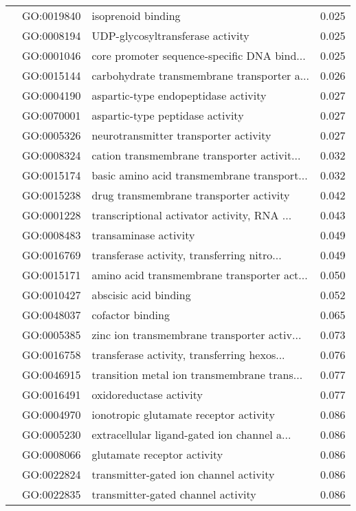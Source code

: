 \begin{longtable}{lllr}
   & GO:0019840 &                           isoprenoid binding &         0.025 \\
   & GO:0008194 &             UDP-glycosyltransferase activity &         0.025 \\
   & GO:0001046 &  core promoter sequence-specific DNA bind... &         0.025 \\
   & GO:0015144 &  carbohydrate transmembrane transporter a... &         0.026 \\
   & GO:0004190 &         aspartic-type endopeptidase activity &         0.027 \\
   & GO:0070001 &             aspartic-type peptidase activity &         0.027 \\
   & GO:0005326 &        neurotransmitter transporter activity &         0.027 \\
   & GO:0008324 &  cation transmembrane transporter activit... &         0.032 \\
   & GO:0015174 &  basic amino acid transmembrane transport... &         0.032 \\
   & GO:0015238 &      drug transmembrane transporter activity &         0.042 \\
   & GO:0001228 &  transcriptional activator activity, RNA ... &         0.043 \\
   & GO:0008483 &                        transaminase activity &         0.049 \\
   & GO:0016769 &  transferase activity, transferring nitro... &         0.049 \\
   & GO:0015171 &  amino acid transmembrane transporter act... &         0.050 \\
   & GO:0010427 &                        abscisic acid binding &         0.052 \\
   & GO:0048037 &                             cofactor binding &         0.065 \\
   & GO:0005385 &  zinc ion transmembrane transporter activ... &         0.073 \\
   & GO:0016758 &  transferase activity, transferring hexos... &         0.076 \\
   & GO:0046915 &  transition metal ion transmembrane trans... &         0.077 \\
   & GO:0016491 &                      oxidoreductase activity &         0.077 \\
   & GO:0004970 &       ionotropic glutamate receptor activity &         0.086 \\
   & GO:0005230 &  extracellular ligand-gated ion channel a... &         0.086 \\
   & GO:0008066 &                  glutamate receptor activity &         0.086 \\
   & GO:0022824 &       transmitter-gated ion channel activity &         0.086 \\
   & GO:0022835 &           transmitter-gated channel activity &         0.086 \\
\end{longtable}
